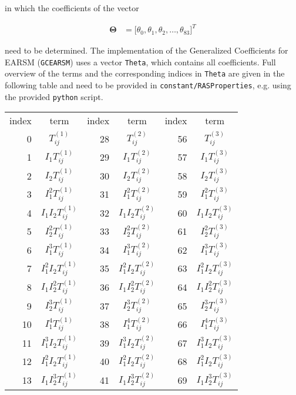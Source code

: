 \documentclass[10pt,a4paper,twoside]{article}
\begin{document}
\noindent in which the coefficients of the vector 

\begin{align}
\bm{\Theta}  &= \Big[ \theta_0, \theta_1, \theta_2, \dots , \theta_{83} \Big]^T
\end{align}

\noindent need to be determined. The implementation of the Generalized Coefficients for EARSM (\texttt{GCEARSM}) uses a vector \texttt{Theta}, which contains all coefficients. Full overview of the terms and the corresponding indices in \texttt{Theta} are given in the following table and need to be provided in \texttt{constant/RASProperties}, e.g. using the provided \texttt{python} script. 


\begin{center}
\begin{tabular}{r|c||r|c||r|c}
index & term & index & term & index & term\\
0 & $T_{ij}^{(1)}$ & 28 & $T_{ij}^{(2)}$ & 56 & $T_{ij}^{(3)}$ \\
1 & $I_1 T_{ij}^{(1)}$ & 29 & $I_1 T_{ij}^{(2)}$ & 57 & $I_1 T_{ij}^{(3)}$\\
2 & $I_2 T_{ij}^{(1)}$ & 30 & $I_2 T_{ij}^{(2)}$ & 58 & $I_2 T_{ij}^{(3)}$\\
3 & $I_1^2 T_{ij}^{(1)}$ & 31 & $I_1^2 T_{ij}^{(2)}$ & 59 & $I_1^2 T_{ij}^{(3)}$\\
4 & $I_1 I_2 T_{ij}^{(1)}$ & 32 & $I_1 I_2 T_{ij}^{(2)}$ & 60 & $I_1 I_2 T_{ij}^{(3)}$\\
5 & $I_2^2 T_{ij}^{(1)}$ & 33 & $I_2^2 T_{ij}^{(2)}$ & 61 & $I_2^2 T_{ij}^{(3)}$\\
6 & $I_1^3 T_{ij}^{(1)}$ & 34 & $I_1^3 T_{ij}^{(2)}$ & 62 & $I_1^3 T_{ij}^{(3)}$\\
7 & $I_1^2I_2 T_{ij}^{(1)}$ & 35 & $I_1^2I_2 T_{ij}^{(2)}$ & 63 & $I_1^2I_2 T_{ij}^{(3)}$\\
8 & $I_1I_2^2 T_{ij}^{(1)}$ & 36 & $I_1I_2^2 T_{ij}^{(2)}$ & 64 & $I_1I_2^2 T_{ij}^{(3)}$\\
9 & $I_2^3 T_{ij}^{(1)}$ & 37 & $I_2^3 T_{ij}^{(2)}$ & 65 & $I_2^3 T_{ij}^{(3)}$\\
10 & $I_1^4 T_{ij}^{(1)}$ & 38 & $I_1^4 T_{ij}^{(2)}$ & 66 & $I_1^4 T_{ij}^{(3)}$\\
11 & $I_1^3I_2 T_{ij}^{(1)}$ & 39 & $I_1^3I_2 T_{ij}^{(2)}$ & 67 & $I_1^3I_2 T_{ij}^{(3)}$\\
12 & $I_1^2I_2 T_{ij}^{(1)}$ & 40 & $I_1^2I_2 T_{ij}^{(2)}$ & 68 & $I_1^2I_2 T_{ij}^{(3)}$\\
13 & $I_1I_2^3 T_{ij}^{(1)}$ & 41 & $I_1I_2^3 T_{ij}^{(2)}$ & 69 & $I_1I_2^3 T_{ij}^{(3)}$\\

\end{tabular}
\end{center}
\end{document}
